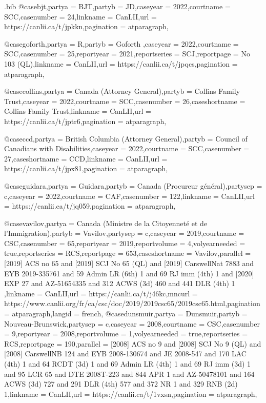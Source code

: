 
\begin{filecontents*}[overwrite]{\jobname.bib}
@case{bjt,partya = {BJT},partyb = {JD\@},caseyear = {2022},courtname = {SCC},casenumber = {24},linkname = {CanLII},url = {https://canlii.ca/t/jpkkn},pagination = {atparagraph},}

@case{goforth,partya = {R},partyb = {Goforth },caseyear = {2022},courtname = {SCC},casenumber = {25},reportyear = {2021},reportseries = {SCJ},reportpage = {No 103 (QL)},linkname = {CanLII},url = {https://canlii.ca/t/jpqcs},pagination = {atparagraph},}

@case{collins,partya = {Canada (Attorney General)},partyb = {Collins Family Trust},caseyear = {2022},courtname = {SCC},casenumber = {26},caseshortname = {Collins Family Trust},linkname = {CanLII},url = {https://canlii.ca/t/jptr6},pagination = {atparagraph},}

@case{ccd,partya = {British Columbia (Attorney General)},partyb = {Council of Canadians with Disabilities},caseyear = {2022},courtname = {SCC},casenumber = {27},caseshortname = {CCD},linkname = {CanLII},url = {https://canlii.ca/t/jpx81},pagination = {atparagraph},}

@case{guidara,partya = {Guidara},partyb = {Canada (Procureur général)},partysep = {c},caseyear = {2022},courtname = {CAF},casenumber = {122},linkname = {CanLII},url = {https://canlii.ca/t/jq059},pagination = {atparagraph},}

@case{vavilov,partya = {Canada (Ministre de la Citoyenneté et de l’Immigration)},partyb = {Vavilov},partysep = {c},caseyear = {2019},courtname = {CSC},casenumber = {65},reportyear = {2019},reportvolume = {4},volyearneeded = {true},reportseries = {RCS},reportpage = {653},caseshortname = {Vavilov},parallel = { [2019] ACS no 65 and [2019] SCJ No 65 (QL) and [2019] CarswellNat 7883 and EYB 2019-335761 and 59 Admin LR (6th) 1 and 69 RJ imm (4th) 1 and [2020] EXP 27 and AZ-51654335 and 312 ACWS (3d) 460 and 441 DLR (4th) 1 },linkname = {CanLII},url = {https://canlii.ca/t/j46kc},mncurl = {https://www.canlii.org/fr/ca/csc/doc/2019/2019csc65/2019csc65.html},pagination = {atparagraph},langid = {french},}
@case{dunsmuir,partya = {Dunsmuir},partyb = {Nouveau-Brunswick},partysep = {c},caseyear = {2008},courtname = {CSC},casenumber = {9},reportyear = {2008},reportvolume = {1},volyearneeded = {true},reportseries = {RCS},reportpage = {190},parallel = { [2008] ACS no 9 and [2008] SCJ No 9 (QL) and [2008] CarswellNB 124 and EYB 2008-130674 and JE 2008-547 and 170 LAC (4th) 1 and 64 RCDT (3d) 1 and 69 Admin LR (4th) 1 and 69 RJ imm (3d) 1 and 95 LCR 65 and DTE 2008T-223 and 844 APR 1 and AZ-50478101 and 164 ACWS (3d) 727 and 291 DLR (4th) 577 and 372 NR 1 and 329 RNB (2d) 1},linkname = {CanLII},url = {https://canlii.ca/t/1vxsn},pagination = {atparagraph},}



\end{filecontents*}



